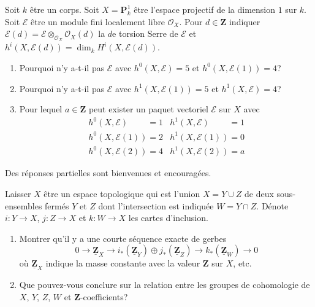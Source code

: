 \begin{exercise}
\label{exercise-can-there-be}
Soit $k$ être un corps. Soit $X = \mathbf{P}^1_k$
être l'espace projectif de la dimension $1$ sur $k$. Soit
$\mathcal{E}$ être un module fini localement libre
$\mathcal{O}_X$. Pour $d \in \mathbf{Z}$ indiquer $\mathcal{E}(d) = \mathcal{E} \otimes_{\mathcal{O}_X}
\mathcal{O}_X(d)$ la $d$e torsion Serre de
$\mathcal{E}$ et $h^i(X, \mathcal{E}(d)) = \dim_k H^i(X, \mathcal{E}(d))$.
\begin{enumerate}
\item Pourquoi n'y a-t-il pas $\mathcal{E}$
avec $h^0(X, \mathcal{E}) = 5$ et $h^0(X, \mathcal{E}(1)) = 4$?
\item Pourquoi n'y a-t-il pas $\mathcal{E}$
avec $h^1(X, \mathcal{E}(1)) = 5$ et $h^1(X, \mathcal{E}) = 4$?
\item Pour lequel $a \in \mathbf{Z}$ peut exister un paquet vectoriel
$\mathcal{E}$ sur $X$ avec
$$
\begin{matrix}
h^0(X, \mathcal{E})\phantom{(1)} = 1 &
h^1(X, \mathcal{E})\phantom{(1)} = 1 \\
h^0(X, \mathcal{E}(1)) = 2 &
h^1(X, \mathcal{E}(1)) = 0 \\
h^0(X, \mathcal{E}(2)) = 4 &
h^1(X, \mathcal{E}(2)) = a
\end{matrix}
$$
\end{enumerate}
Des réponses partielles sont bienvenues et encouragées.
\end{exercise}

\begin{exercise}
\label{exercise-banana}
Laisser $X$ être un espace topologique qui est l'union $X =
Y \cup Z$ de deux sous-ensembles fermés
$Y$ et $Z$ dont l'intersection est indiquée $W = Y \cap Z$. Dénote $i :
Y \to X$, $j : Z \to X$ et $k : W \to X$ les cartes
d'inclusion.
\begin{enumerate}
\item Montrer qu'il y a une courte séquence exacte de gerbes
$$
0 \to \underline{\mathbf{Z}}_X \to
i_*(\underline{\mathbf{Z}}_Y) \oplus
j_*(\underline{\mathbf{Z}}_Z) \to
k_*(\underline{\mathbf{Z}}_W) \to 0
$$
où $\underline{\mathbf{Z}}_X$ indique la masse constante avec la
valeur $\mathbf{Z}$ sur $X$, etc.
\item Que pouvez-vous conclure sur la relation entre les
groupes de cohomologie de $X$, $Y$, $Z$, $W$ et $\mathbf{Z}$-coefficients?
\end{enumerate}
\end{exercise}

